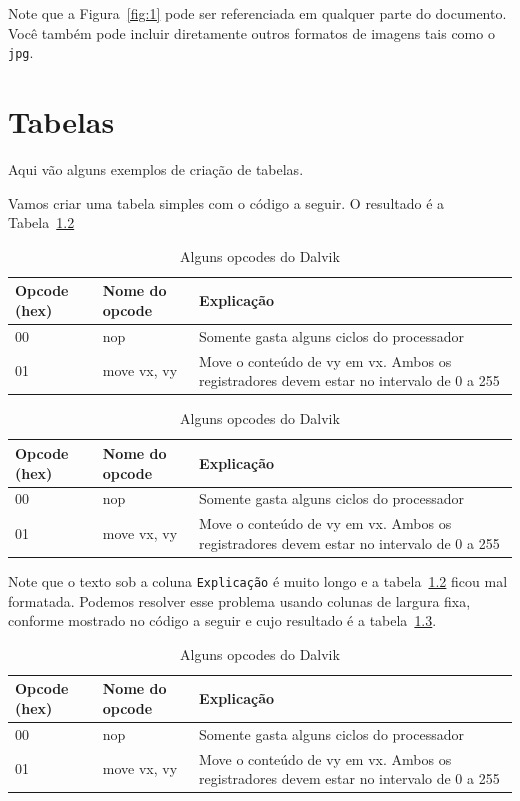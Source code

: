 \documentclass[12pt,a4paper,twoside]{report}
\begin{document}
Note que a Figura~\ref{fig:1} pode ser referenciada em qualquer parte do documento.  Você também pode incluir diretamente outros formatos de imagens tais como o \texttt{jpg}.

\chapter{Tabelas}

Aqui vão alguns exemplos de criação de tabelas.

Vamos criar uma tabela simples com o código a seguir. O resultado é a 
Tabela~\ref{tab:opcode1}

\begin{latex}
\begin{table}[h]
  \centering
  \caption{Alguns opcodes do Dalvik \label{tab:opcode1}}
  \begin{tabular}{lll} \hline
  {\bf Opcode (hex)} & {\bf Nome do opcode} & {\bf Explicação} \\ \hline
  00 & nop & Somente gasta alguns ciclos do processador \\ \hline
  01 & move vx, vy & Move o conteúdo de vy em vx. Ambos os registradores
   devem estar no intervalo de 0 a 255 \\\hline
  \end{tabular}
\end{table}
\end{latex}

\begin{table}[h]
  \centering
  \caption{Alguns opcodes do Dalvik \label{tab:opcode1}}
  \begin{tabular}{lll} \hline
  {\bf Opcode (hex)} & {\bf Nome do opcode} & {\bf Explicação} \\ \hline
  00 & nop & Somente gasta alguns ciclos do processador \\ \hline
  01 & move vx, vy & Move o conteúdo de vy em vx. Ambos os registradores
   devem estar no intervalo de 0 a 255 \\\hline
  \end{tabular}
\end{table}

Note que o texto sob a coluna \texttt{Explicação} é muito longo e a
tabela~\ref{tab:opcode1} ficou mal formatada. Podemos resolver esse problema
usando colunas de largura fixa, conforme mostrado no código a seguir e cujo
resultado é a tabela~\ref{tab:opcode2}.

\begin{latex}
\begin{table}[h]
  \centering
  \caption{Alguns opcodes do Dalvik \label{tab:opcode2}}
  \begin{tabular}{p{1.5cm}lp{9cm}} \hline
  {\bf Opcode (hex)} & {\bf Nome do opcode} & {\bf Explicação} \\ \hline
  00 & nop & Somente gasta alguns ciclos do processador \\ \hline
  01 & move vx, vy & Move o conteúdo de vy em vx. Ambos os registradores
   devem estar no intervalo de 0 a 255 \\\hline
  \end{tabular}
\end{table}
\end{latex}
\end{document}

